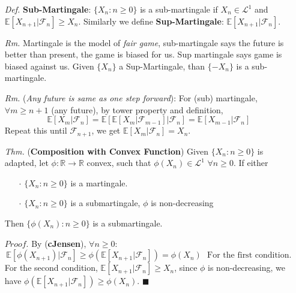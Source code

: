 \documentclass[a4paper,12pt,twoside]{book}
\begin{document}
\begin{itemize}
	\item[\textit{Def.}] \textbf{Sub-Martingale}: $\{X_n:n\geq 0\}$ is a sub-martingale if $X_n \in \mathcal{L}^1$ and $\mathbb{E}\left[X_{n+1}|\mathcal{F}_n\right]\geq X_n$. Similarly we define \textbf{Sup-Martingale}: $\mathbb{E}\left[X_{n+1}|\mathcal{F}_n\right]$.

	\item[\textit{Rm.}] Martingale is the model of \textit{fair game}, sub-martingale says the future is better than present, the game is biased for us. Sup martingale says game is biased against us. Given $\{X_n\}$ a Sup-Martingale, than $\{-X_n\}$ is a sub-martingale.

	\item[\textit{Rm.}] (\textit{Any future is same as one step forward}): For (sub) martingale, $\forall m\geq n+1$ (any future), by tower property and definition,
	\begin{equation}
			\mathbb{E}\left[X_m|\mathcal{F}_n\right] = \mathbb{E}\left[\mathbb{E}\left[X_m|\mathcal{F}_{m-1}\right] | \mathcal{F}_n\right]=\mathbb{E}\left[X_{m-1}|\mathcal{F}_n\right]
	\end{equation}
	Repeat this until $\mathcal{F}_{n+1}$, we get $\mathbb{E}\left[X_m|\mathcal{F}_n\right]= X_n$.

	\item[\textit{Thm.}] (\textbf{Composition with Convex Function}) Given $\{X_n:n\geq 0\}$ is adapted, let $\phi: \mathbb{R}\to \mathbb{R}$ convex, such that $\phi(X_n)\in \mathcal{L}^1$ $\forall n\geq 0$. If either
	\begin{itemize}
		\item[$\cdot$] $\{X_n:n\geq 0\}$ is a martingale.
		\item[$\cdot$] $\{X_n:n\geq 0\}$ is a submartingale, $\phi$ is non-decreasing
	\end{itemize}
	Then $\{\phi(X_n):n\geq 0\}$ is a submartingale.

	\item[$Proof.$] By (\textbf{cJensen}), $\forall n\geq 0$:
	\begin{equation}
		\mathbb{E}\left[\phi(X_{n+1})|\mathcal{F}_n\right] \geq \phi(\mathbb{E}\left[X_{n+1}|\mathcal{F}_n\right])=\phi(X_n)~~~\text{For the first condition}.
	\end{equation}
	For the second condition, $\mathbb{E}\left[X_{n+1}|\mathcal{F}_n\right]\geq X_n$, since $\phi$ is non-decreasing, we have $\phi(\mathbb{E}\left[X_{n+1}|\mathcal{F}_n\right])\geq \phi(X_n)$. $\blacksquare$


\end{itemize}
\end{document}
